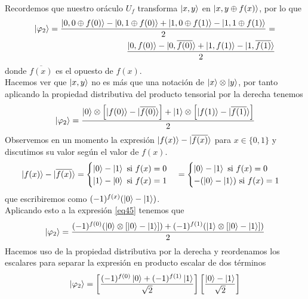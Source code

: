 \documentclass[a4paper]{article}
\numberwithin{equation}{section}
\begin{document}
Recordemos que nuestro oráculo $U_f$ transforma $\ket{x,y}$ en $\ket{x,y\oplus f(x)}$, por lo que
\begin{equation}
\begin{split}
\ket{\varphi_2} =
\frac{\ket{0,0\oplus f(0)} - \ket{0,1\oplus f(0)} + \ket{1, 0\oplus f(1)} - \ket{1, 1\oplus f(1)}}{2} = \\
\frac{\ket{0,f(0)} - \ket{0,\overline{f(0)}} + \ket{1,f(1)} - \ket{1,\overline{f(1)}}}{2}
\end{split}
\end{equation}
donde $\overline{f(x)}$ es el opuesto de $f(x)$.\\
Hacemos ver que $\ket{x,y}$ no es más que una notación de $\ket{x}\otimes\ket{y}$, por tanto aplicando la propiedad distributiva del producto tensorial por la derecha tenemos
\begin{equation} \label{eq45}
\ket{\varphi_2} =
\frac{\ket{0} \otimes \left[ \ket{f(0)} - \ket{\overline{f(0)}} \right] + \ket{1} \otimes \left[ \ket{f(1)} - \ket{\overline{f(1)}} \right]}{2}
\end{equation}
Observemos en un momento la expresión $\ket{f(x)} -\ket{\overline{f(x)}}$ para $x \in \lbrace 0,1 \rbrace$ y discutimos su valor según el valor de $f(x)$.
\begin{equation} \label{eq413}
\ket{f(x)} - \ket{\overline{f(x)}} =
\begin{cases}
\ket{0} - \ket{1} \ \textrm{si} \ f(x) = 0 \\
\ket{1} - \ket{0} \ \textrm{si} \ f(x) = 1
\end{cases} =
\begin{cases}
\ket{0} - \ket{1} \ \textrm{si} \ f(x) = 0 \\
-(\ket{0} - \ket{1}) \ \textrm{si} \ f(x) = 1
\end{cases}
\end{equation}
que escribiremos como $(-1)^{f(x)}(\ket{0} - \ket{1})$.\\
Aplicando esto a la expresión \ref{eq45} tenemos que
\begin{equation}
\ket{\varphi_2} = 
\frac{(-1)^{f(0)} (\ket{0} \otimes \left[ \ket{0} - \ket{1} \right]) + (-1)^{f(1)} (\ket{1} \otimes \left[ \ket{0} - \ket{1} \right])}{2}
\end{equation}
Hacemos uso de la propiedad distributiva por la derecha y reordenamos los escalares para separar la expresión en producto escalar de dos términos
\begin{equation}
\ket{\varphi_2} =
\left[ \frac{(-1)^{f(0)} \ket{0} + (-1)^{f(1)} \ket{1}}{\sqrt{2}} \right]
\left[ \frac{\ket{0} - \ket{1}}{\sqrt{2}} \right]
\end{equation}
\end{document}
